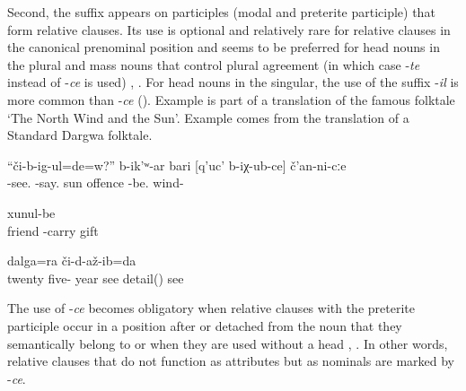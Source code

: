 Second, the suffix appears on participles (modal and preterite participle) that form relative clauses. Its use is optional and relatively rare for relative clauses in the canonical prenominal position and seems to be preferred for head nouns in the plural and mass nouns that control plural agreement (in which case -\textit{te} instead of -\textit{ce} is used) , . For head nouns in the singular, the use of the suffix -\textit{il} is more common than -\textit{ce} (). Example  is part of a translation of the famous folktale `The North Wind and the Sun’. Example  comes from the translation of a Standard Dargwa folktale. 

\begin{exe}

\ex	\label{Do you see?'' said the sun to the offended wind.}
\gll ``či-b-ig-ul=de=w?''	b-ik'ʷ-ar	bari	[q'uc'	b-iχ-ub-ce]	č'an-ni-cːe\\
-see.	-say.	sun	offence	-be.	wind-\\
\glt {}

	\ex	\label{ex:the gifts that the friends had brought to him@16a}
		xunul-be\\
		friend		-carry	gift\\
	\glt	{}
	
			\ex	\label{ex:I saw the details that I did not see for 25 years}
		dalga=ra	či-d-až-ib=da\\
		twenty	five-	year	see 	detail()	see\\
	\glt	{}
\end{exe}

The use of -\textit{ce} becomes obligatory when relative clauses with the preterite participle occur in a position after or detached from the noun that they semantically belong to  or when they are used without a head , . In other words, relative clauses that do not function as attributes but as nominals are marked by -\textit{ce}.

